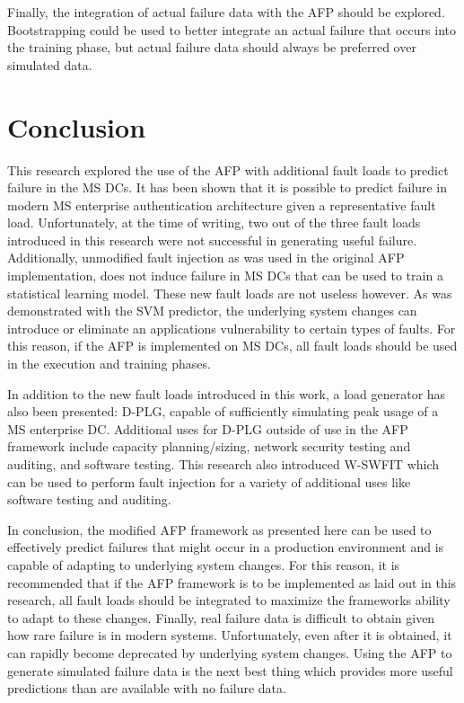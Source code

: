 Finally, the integration of actual failure data with the \ac{AFP} should be
explored.  Bootstrapping could be used to better integrate an actual failure
that occurs into the training phase, but actual failure data should always be
preferred over simulated data.

\section{Conclusion}
This research explored the use of the AFP with additional fault loads to
predict failure in the \ac{MS} \ac{DC}s.  It has been shown that it is possible
to predict failure in modern \ac{MS} enterprise authentication architecture
given a representative fault load.  Unfortunately, at the time of writing, two
out of the three fault loads introduced in this research were not successful in
generating useful failure.  Additionally, unmodified fault injection as was
used in the original \ac{AFP} implementation, does not induce failure in
\ac{MS} \ac{DC}s that can be used to train a statistical learning model.  These
new fault loads are not useless however.  As was demonstrated with the \ac{SVM}
predictor, the underlying system changes can introduce or eliminate an
applications vulnerability to certain types of faults.  For this reason, if the
\ac{AFP} is implemented on \ac{MS} \ac{DC}s, all fault loads should be used in
the execution and training phases.

In addition to the new fault loads introduced in this work, a load generator
has also been presented:  \ac{D-PLG}, capable of sufficiently simulating peak
usage of a \ac{MS} enterprise \ac{DC}.  Additional uses for \ac{D-PLG} outside
of use in the \ac{AFP} framework include capacity planning/sizing, network
security testing and auditing, and software testing.  This research also
introduced \ac{W-SWFIT} which can be used to perform fault injection for a
variety of additional uses like software testing and auditing.

In conclusion, the modified \ac{AFP} framework as presented here can be used to
effectively predict failures that might occur in a production environment and
is capable of adapting to underlying system changes.  For this reason, it is
recommended that if the \ac{AFP} framework is to be implemented as laid out in
this research, all fault loads should be integrated to maximize the frameworks
ability to adapt to these changes.  Finally, real failure data is difficult to
obtain given how rare failure is in modern systems.  Unfortunately, even after
it is obtained, it can rapidly become deprecated by underlying system changes.
Using the \ac{AFP} to generate simulated failure data is the next best thing
which provides more useful predictions than are available with no failure data.
